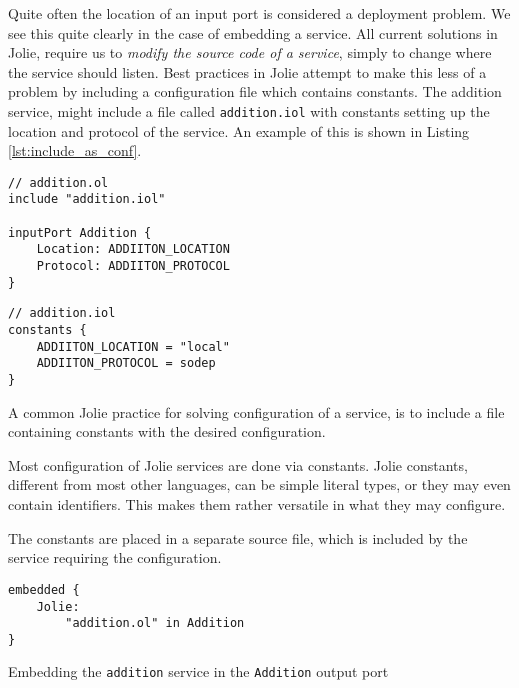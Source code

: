 Quite often the location of an input port is considered a deployment problem.
We see this quite clearly in the case of embedding a service. All current
solutions in Jolie, require us to \emph{modify the source code of a service},
simply to change where the service should listen. Best practices in Jolie
attempt to make this less of a problem by including a configuration file which
contains constants. The addition service, might include a file called
\verb!addition.iol! with constants setting up the location and protocol
of the service. An example of this is shown in Listing
\ref{lst:include_as_conf}.

\begin{listing}[H]
\begin{multicols}{2}

\begin{verbatim}
// addition.ol
include "addition.iol"

inputPort Addition {
    Location: ADDIITON_LOCATION
    Protocol: ADDIITON_PROTOCOL
}
\end{verbatim}

\columnbreak

\begin{verbatim}
// addition.iol
constants {
    ADDIITON_LOCATION = "local"
    ADDIITON_PROTOCOL = sodep
}
\end{verbatim}

\end{multicols}

\caption{A common Jolie practice for solving configuration of a service, is to
    include a file containing constants with the desired configuration.}

\label{lst:include_as_conf}

\end{listing}

\begin{observation}
    Most configuration of Jolie services are done via constants. Jolie
    constants, different from most other languages, can be simple literal
    types, or they may even contain identifiers. This makes them rather
    versatile in what they may configure.

    The constants are placed in a separate source file, which is included by
    the service requiring the configuration.
\end{observation}

\begin{listing}[H]
\begin{verbatim}
embedded {
    Jolie:
        "addition.ol" in Addition
}
\end{verbatim}

\caption{Embedding the \texttt{addition} service in the
    \texttt{Addition} output port}

\label{lst:simple_embedding}

\end{listing}

